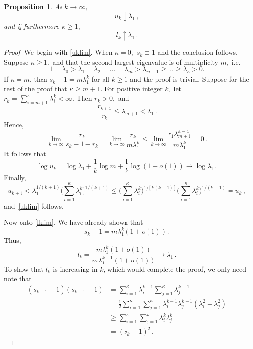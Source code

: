 \documentclass[11pt]{article}
\newtheorem{proposition}{Proposition}
\begin{document}
	\begin{proposition} \label{eigenlim}
		As $k \to \infty$,
		\begin{equation} \label{uklim}
		u_k \downarrow \lambda_1 \,,
		\end{equation}
		and if furthermore $\kappa \geq 1,$
		\begin{equation} \label{lklim}
		l_k \uparrow \lambda_1 \,.
		\end{equation}
	\end{proposition}
	\begin{proof}
          We begin with \eqref{uklim}.  When $\kappa = 0,$ $s_k \equiv
          1$ and the conclusion follows. Suppose $\kappa \geq 1,$ and
          that the second largest eigenvalue is of multiplicity $m,$
          i.e.
		\[
		1 = \lambda_0 > \lambda_1 = \lambda_2 = \dots =
                \lambda_m > \lambda_{m+1} \geq \dots \geq
                \lambda_{\kappa} > 0.
		\]
		If $\kappa = m$, then $s_k - 1 = m\lambda_1^k$ for all
                $k\geq 1$ and the proof is trivial. Suppose for the
                rest of the proof that $\kappa \geq m+1.$ For positive
                integer $k,$ let $r_k = \sum_{i=m+1}^{\kappa}
                \lambda_i^k < \infty.$ Then $r_k > 0,$ and
		\[
		\frac{r_{k+1}}{r_k} \leq \lambda_{m+1} < \lambda_1 \,.
		\]
		Hence,
		\[
		\lim\limits_{k \to \infty} \frac{r_k}{s_k-1-r_k} =
                \lim\limits_{k \to \infty} \frac{r_k}{m\lambda_1^k}
                \leq \lim\limits_{k \to \infty}
                \frac{r_1\lambda_{m+1}^{k-1}}{m\lambda_1^k} = 0 \,.
		\]
		It follows that
		\[
		\log u_k = \log \lambda_1 + \frac{1}{k}\log m +
                \frac{1}{k} \log (1+o(1)) \to \log \lambda_1 \,.
		\]
		Finally,
		\[
		u_{k+1} < \lambda_1^{1/(k+1)} \Big(
                \sum_{i=1}^{\kappa} \lambda_i^k \Big)^{1/(k+1)} \leq
                \Big( \sum_{i=1}^{\kappa} \lambda_i^k
                \Big)^{1/[k(k+1)]} \Big( \sum_{i=1}^{\kappa}
                \lambda_i^k \Big)^{1/(k+1)} = u_k \,,
		\]
		and~\eqref{uklim} follows.
		
                Now onto \eqref{lklim}.  We have already shown that
		\[
		s_k - 1 = m\lambda_1^k(1+o(1)) \,.
		\]
		Thus,
		\[
		l_k =
                \frac{m\lambda_1^k(1+o(1))}{m\lambda_1^{k-1}(1+o(1))}
                \to \lambda_1 \,.
		\]
		To show that $l_k$ is increasing in $k$, which would
                complete the proof, we only need note that
		\[
		\begin{aligned}
                  (s_{k+1}-1)(s_{k-1}-1) &= \sum_{i=1}^{\kappa} \lambda_i^{k+1} \sum_{j=1}^{\kappa} \lambda_j^{k-1} \\
                  &= \frac{1}{2}\sum_{i=1}^{\kappa} \sum_{j=1}^{\kappa} \lambda_i^{k-1}\lambda_j^{k-1} (\lambda_i^2 + \lambda_j^2) \\
                  & \geq \sum_{i=1}^{\kappa} \sum_{j=1}^{\kappa} \lambda_i^{k}\lambda_j^{k} \\
                  &= (s_k-1)^2 \,.
		\end{aligned}
		\]
	\end{proof}
	
\end{document}
